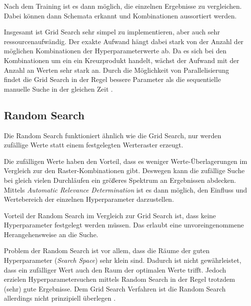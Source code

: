 Nach dem Training ist es dann möglich, die einzelnen Ergebnisse zu vergleichen.
Dabei können dann Schemata erkannt und Kombinationen aussortiert werden.
\newline

Insgesamt ist Grid Search sehr simpel zu implementieren, aber auch sehr ressourcenaufwändig.
Der exakte Aufwand hängt dabei stark von der Anzahl der möglichen Kombinationen der Hyperparameterwerte ab.
Da es sich bei den Kombinationen um ein ein Kreuzprodukt handelt, wächst der Aufwand mit der Anzahl an Werten sehr stark an.
Durch die Möglichkeit von Parallelisierung findet die Grid Search in der Regel bessere Parameter als die sequentielle manuelle Suche in der gleichen Zeit \cite{hyperparameters-random-search}.

\subsection{Random Search}
Die Random Search \cite{hyperparameters-random-search} funktioniert ähnlich wie die Grid Search, nur werden zufällige Werte statt einem festgelegten Werteraster erzeugt.
\newline

Die zufälligen Werte haben den Vorteil, dass es weniger Werte-Überlagerungen im Vergleich zur den Raster-Kombinationen gibt.
Deswegen kann die zufällige Suche bei gleich vielen Durchläufen ein größeres Spektrum an Ergebnissen abdecken.
Mittels \textit{Automatic Relevance Determination} \cite{automatic-relevance-determination} ist es dann möglich, den Einfluss und Wertebereich der einzelnen Hyperparameter darzustellen.
\newline

Vorteil der Random Search im Vergleich zur Grid Search ist, dass keine Hyperparameter festgelegt werden müssen.
Das erlaubt eine unvoreingenommene Herangehensweise an die Suche.
\newline

Problem der Random Search ist vor allem, dass die Räume der guten Hyperparameter (\textit{Search Space}) sehr klein sind.
Dadurch ist nicht gewährleistet, dass ein zufälliger Wert auch den Raum der optimalen Werte trifft.
Jedoch erzielen Hyperparametersuchen mittels Random Search in der Regel trotzdem (sehr) gute Ergebnisse.
Dem Grid Search Verfahren ist die Random Search allerdings nicht prinzipiell überlegen \cite{hyperparameters-random-search}.
\newline

